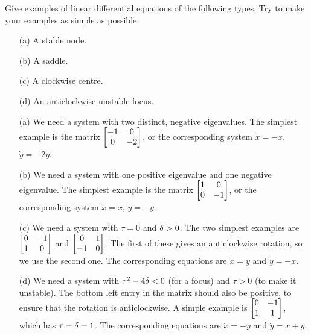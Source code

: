 \documentclass[a4paper]{amsart}
\begin{document}
\begin{exercise}\label{ex-linear-find-eg-a}
 Give examples of linear differential equations of the following
 types.  Try to make your examples as simple as possible.
 \begin{itemize}
  \item[(a)] A stable node.
  \item[(b)] A saddle.
  \item[(c)] A clockwise centre.
  \item[(d)] An anticlockwise unstable focus.
 \end{itemize}
\end{exercise}
\begin{solution}\leavevmode
 \begin{itemize}
  \item[(a)] We need a system with two distinct, negative
   eigenvalues.  The simplest example is the matrix
   $\left[\begin{matrix} -1&0\\0&-2\end{matrix}\right]$, or the corresponding system $\dot{x}=-x$, 
   $\dot{y}=-2y$. 
  \item[(b)] We need a system with one positive eigenvalue and one
   negative eigenvalue.  The simplest example is the matrix
   $\left[\begin{matrix} 1&0\\0&-1\end{matrix}\right]$, or the corresponding system $\dot{x}=x$,
   $\dot{y}=-y$.
  \item[(c)] We need a system with $\tau=0$ and $\delta>0$.  The two
   simplest examples are $\left[\begin{matrix} 0&-1\\ 1&0\end{matrix}\right]$ and 
   $\left[\begin{matrix} 0&1\\-1&0\end{matrix}\right]$.  The first of these gives an anticlockwise
   rotation, so we use the second one.  The corresponding equations
   are $\dot{x}=y$ and $\dot{y}=-x$.
  \item[(d)] We need a system with $\tau^2-4\delta<0$ (for a focus) and
   $\tau>0$ (to make it unstable).  The bottom left entry in the
   matrix should also be positive, to ensure that the rotation is
   anticlockwise.  A simple example is $\left[\begin{matrix} 0&-1\\1&1\end{matrix}\right]$, which has
   $\tau=\delta=1$.  The corresponding equations are $\dot{x}=-y$ and
   $\dot{y}=x+y$.  
 \end{itemize}
\end{solution}
\end{document}
